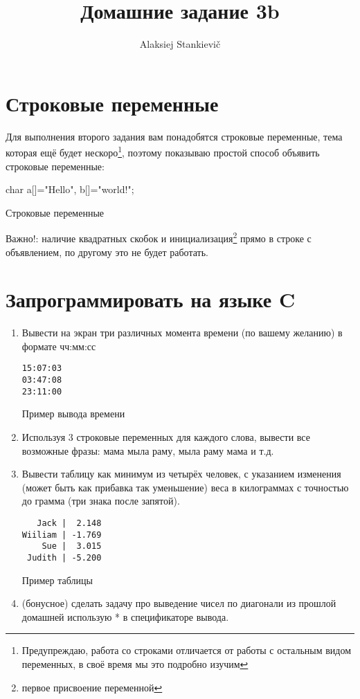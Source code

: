 \documentclass[12pt]{article}
\author{Alaksiej Stankievič}
\title{Домашние задание 3b}
\begin{document}
 \section*{Строковые переменные}
 Для выполнения второго задания вам понадобятся строковые переменные, тема которая ещё будет 
нескоро\footnote{Предупреждаю, работа со строками отличается от работы с остальным видом переменных, в своё время мы 
это подробно изучим}, поэтому показываю простой способ объявить строковые переменные:
\begin{listing}[H]
 \begin{center}
  \begin{ccode}
    char a[]="Hello", b[]="world!";
  \end{ccode}
 \end{center}
 \caption{Строковые переменные}
 \label{lst:stringvariables}
\end{listing}
Важно!: наличие квадратных скобок и инициализация\footnote{первое присвоение переменной} прямо в строке с объявлением, 
по другому это не будет работать.

 \section*{Запрограммировать на языке C}
 \begin{enumerate}
 \item Вывести на экран три различных момента времени (по вашему желанию) в формате чч:мм:сс
 \begin{listing}[H]
  \begin{verbatim}
15:07:03
03:47:08
23:11:00
  \end{verbatim}
\caption{Пример вывода времени}
\label{lst:threetimes}
 \end{listing}
 \item  Используя 3 строковые переменных для каждого слова, вывести все возможные фразы: мама мыла раму, мыла раму мама 
и т.д.
 \item Вывести таблицу как минимум из четырёх человек, с указанием изменения (может быть как прибавка так уменьшение) 
веса в килограммах с точностью до грамма (три знака после запятой).
 \begin{listing}[H]
  \begin{verbatim}
   Jack |  2.148
Wiiliam | -1.769
    Sue |  3.015
 Judith | -5.200
  \end{verbatim}
\caption{Пример таблицы}
\label{lst:weighttable}
 \end{listing}
 \item (бонусное) сделать задачу про выведение чисел по диагонали из прошлой домашней использую * в спецификаторе 
вывода.
\end{enumerate}
\end{document}
